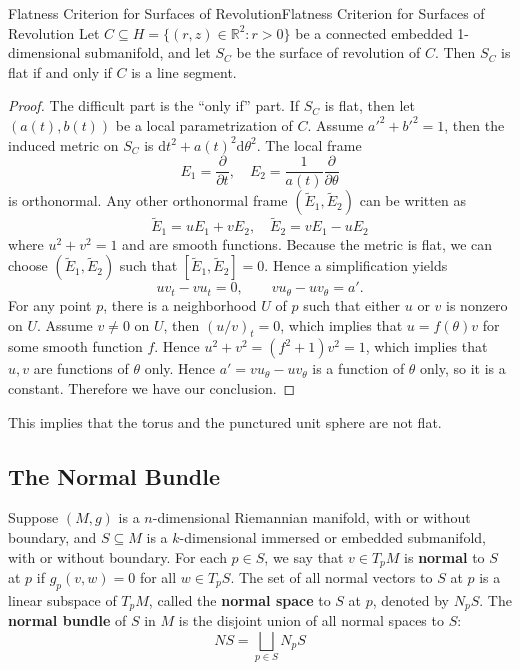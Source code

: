 \documentclass[../main.tex]{subfiles}
\begin{document}
\begin{proposition}{Flatness Criterion for Surfaces of Revolution}{Flatness Criterion for Surfaces of Revolution}
  Let $C \subseteq H = \{(r,z)\in \mathbb{R}^2: r>0\}$ be a connected embedded 1-dimensional submanifold, and let $S_C$ be the surface of revolution of $C$. Then $S_C$ is flat if and only if $C$ is a line segment.
\end{proposition}
\begin{proof}
  The difficult part is the ``only if'' part. If $S_C$ is flat, then let $(a(t), b(t))$ be a local parametrization of $C$. Assume $a'^2 + b'^2 = 1$, then the induced metric on $S_C$ is $\mathrm{d} t^2 + a(t)^2 \mathrm{d} \theta^2$. The local frame
  \begin{equation*}
    E_1 = \frac{\partial}{\partial t}, \quad E_2 = \frac{1}{a(t)}\frac{\partial}{\partial \theta}
  \end{equation*}
  is orthonormal. Any other orthonormal frame $(\tilde{E}_1, \tilde{E}_2)$ can be written as
  \begin{equation*}
    \tilde{E}_1 = uE_1 + vE_2, \quad \tilde{E}_2 = vE_1 - uE_2
  \end{equation*}
  where $u^2 + v^2 = 1$ and are smooth functions. Because the metric is flat, we can choose $(\tilde{E}_1, \tilde{E}_2)$ such that $[\tilde{E}_1, \tilde{E}_2] = 0$. Hence a simplification yields
  \begin{equation*}
    u v_t - v u_t = 0, \qquad v u_\theta - u v_\theta = a'.
  \end{equation*}
  For any point $p$, there is a neighborhood $U$ of $p$ such that either $u$ or $v$ is nonzero on $U$. Assume $v\neq 0$ on $U$, then $(u / v)_t = 0$, which implies that $u = f(\theta) v$ for some smooth function $f$. Hence $u^2 + v^2 = (f^2 + 1)v^2 = 1$, which implies that $u,v$ are functions of $\theta$ only. Hence $a' = v u_\theta - u v_\theta$ is a function of $\theta$ only, so it is a constant. Therefore we have our conclusion.
\end{proof}

This implies that the torus and the punctured unit sphere are not flat.

\subsection{The Normal Bundle}
Suppose $(M,g)$ is a $n$-dimensional Riemannian manifold, with or without boundary, and $S\subseteq M$ is a $k$-dimensional immersed or embedded submanifold, with or without boundary. For each $p\in S$, we say that $v\in T_pM$ is \textbf{normal} to $S$ at $p$ if $g_p(v,w) = 0$ for all $w\in T_pS$. The set of all normal vectors to $S$ at $p$ is a linear subspace of $T_pM$, called the \textbf{normal space} to $S$ at $p$, denoted by $N_pS$. The \textbf{normal bundle} of $S$ in $M$ is the disjoint union of all normal spaces to $S$:
\begin{equation*}
  NS = \bigsqcup_{p\in S} N_pS
\end{equation*}
\end{document}
